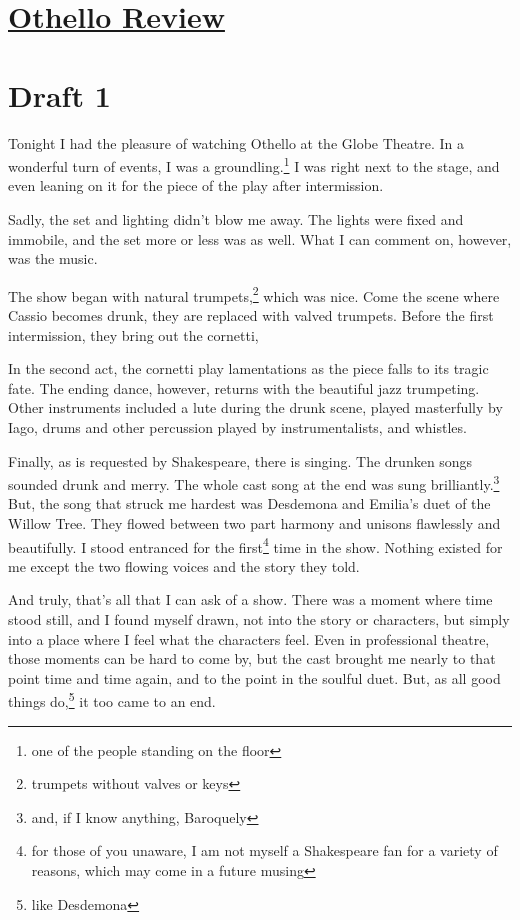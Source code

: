 \documentclass[12pt]{article}[titlepage]
\newcommand{\1}{\={a}}
\newcommand{\2}{\={e}}
\newcommand{\3}{\={\i}}
\newcommand{\4}{\=o}
\newcommand{\5}{\=u}
\newcommand{\6}{\={A}}
\renewcommand{\,}{\textsuperscript{,}}
\begin{document}
\doublespacing
\section{\href{othello.html}{Othello Review}}
\section{Draft 1}
Tonight I had the pleasure of watching Othello at the Globe Theatre.
In a wonderful turn of events, I was a groundling.\footnote{one of the people standing on the floor}
I was right next to the stage, and even leaning on it for the piece of the play after intermission.

Sadly, the set and lighting didn't blow me away.
The lights were fixed and immobile, and the set more or less was as well.
What I can comment on, however, was the music.

The show began with natural trumpets,\footnote{trumpets without valves or keys} which was nice.
Come the scene where Cassio becomes drunk, they are replaced with valved trumpets.
Before the first intermission, they bring out the cornetti,

In the second act, the cornetti play lamentations as the piece falls to its tragic fate.
The ending dance, however, returns with the beautiful jazz trumpeting.
Other instruments included a lute during the drunk scene, played masterfully by Iago, drums and other percussion played by instrumentalists, and whistles.

Finally, as is requested by Shakespeare, there is singing.
The drunken songs sounded drunk and merry.
The whole cast song at the end was sung brilliantly.\footnote{and, if I know anything, Baroquely}
But, the song that struck me hardest was Desdemona and Emilia's duet of the Willow Tree.
They flowed between two part harmony and unisons flawlessly and beautifully.
I stood entranced for the first\footnote{for those of you unaware, I am not myself a Shakespeare fan for a variety of reasons, which may come in a future musing} time in the show.
Nothing existed for me except the two flowing voices and the story they told.

And truly, that's all that I can ask of a show.
There was a moment where time stood still, and I found myself drawn, not into the story or characters, but simply into a place where I feel what the characters feel.
Even in professional theatre, those moments can be hard to come by, but the cast brought me nearly to that point time and time again, and to the point in the soulful duet.
But, as all good things do,\footnote{like Desdemona} it too came to an end.
\end{document}

